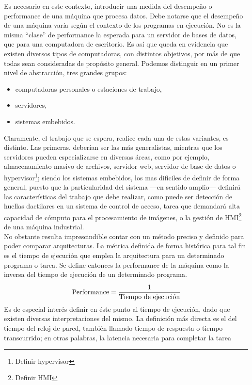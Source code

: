 Es necesario en este contexto, introducir una medida del desempeño o 
performance de una máquina que procesa datos. Debe notarse que el desempeño de 
una máquina varía según el contexto de los programas en ejecución. No es la 
misma ``clase'' de performance la esperada para un servidor de bases de datos, 
que para una computadora de escritorio. Es así que queda en evidencia que 
existen diversos tipos de computadoras, con distintos objetivos, por más de que 
todas sean consideradas de propósito general. Podemos distinguir en un primer 
nivel de abstracción, tres grandes grupos:
\begin{itemize}
  \item computadoras personales o estaciones de trabajo,
  \item servidores,
  \item sistemas embebidos.
\end{itemize}
Claramente, el trabajo que se espera, realice cada una de estas variantes, es 
distinto. Las primeras, deberían ser las más generalistas, mientras que los 
servidores pueden especializarse en diversas áreas, como por ejemplo, 
almacenamiento masivo de archivos, servidor web, servidor de base de datos o 
hypervisor\footnote{Definir hypervisor}; siendo los sistemas embebidos, los mas 
dificiles de definir de forma general, puesto que la particularidad del sistema 
---en sentido amplio--- definirá las características del trabajo que debe 
realizar, como puede ser detección de huellas dactilares en un sistema de 
control de acceso, tarea que demandará alta capacidad de cómputo para el 
procesamiento de imágenes, o la gestión de HMI\footnote{Definir HMI} de una 
máquina industrial.\\
No obstante resulta imprescindible contar con un método preciso y definido para 
poder comparar arquitecturas. La métrica definida de forma histórica para tal 
fin es el tiempo de ejecución que emplea la arquitectura para un determinado 
programa o tarea. Se define entonces la performance de la máquina como la 
inversa del tiempo de ejecución de un determinado programa.
\begin{equation}
  \label{eq:performance-performance definition}
  \text{Performance} = \cfrac{1}{\text{Tiempo de ejecución}}
\end{equation}
Es de especial interés definir en éste punto al tiempo de ejecución, dado que 
existen diversas interpretaciones del mismo. La definición más directa es el 
del tiempo del reloj de pared, también llamado tiempo de respuesta o tiempo 
transcurrido; en otras palabras, la latencia necesaria para completar la tarea 
